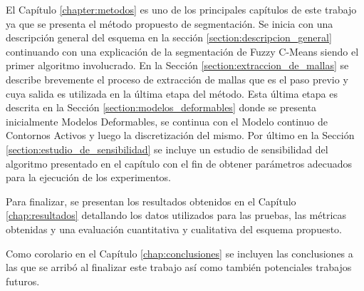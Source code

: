 El Capítulo \ref{chapter:metodos} es uno de los principales capítulos de este trabajo ya que se presenta el método propuesto de segmentación. Se inicia con una descripción general del esquema en la sección \ref{section:descripcion_general} continuando con una explicación de la segmentación de Fuzzy C-Means siendo el primer algoritmo involucrado. En la Sección \ref{section:extraccion_de_mallas} se describe brevemente el proceso de extracción de mallas que es el paso previo y cuya salida es utilizada en la última etapa del método. Esta última etapa es descrita en la Sección \ref{section:modelos_deformables} donde se presenta inicialmente Modelos Deformables, se continua con el Modelo continuo de Contornos Activos y luego la discretización del mismo. Por último en la Sección \ref{section:estudio_de_sensibilidad} se incluye un estudio de sensibilidad del algoritmo presentado en el capítulo con el fin de obtener parámetros adecuados para la ejecución de los experimentos.

Para finalizar, se presentan los resultados obtenidos en el Capítulo \ref{chap:resultados} detallando los datos utilizados para las pruebas, las métricas obtenidas y una evaluación cuantitativa y cualitativa del esquema propuesto.

Como corolario en el Capítulo \ref{chap:conclusiones} se incluyen las conclusiones a las que se arribó al finalizar este trabajo así como también potenciales trabajos futuros.